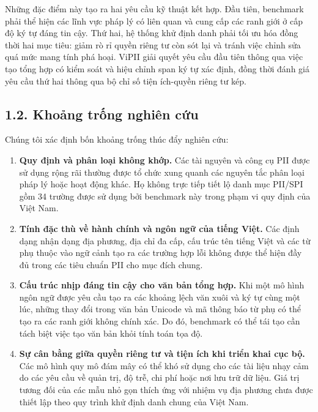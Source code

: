 \documentclass[
  11pt,
  a4paper,
]{article}
\providecommand{\tightlist}{%
  \setlength{\itemsep}{0pt}\setlength{\parskip}{0pt}}
\begin{document}
Những đặc điểm này tạo ra hai yêu cầu kỹ thuật kết hợp. Đầu tiên,
benchmark phải thể hiện các lĩnh vực pháp lý có liên quan và cung cấp
các ranh giới ở cấp độ ký tự đáng tin cậy. Thứ hai, hệ thống khử định
danh phải tối ưu hóa đồng thời hai mục tiêu: giảm rò rỉ quyền riêng tư
còn sót lại và tránh việc chỉnh sửa quá mức mang tính phá hoại. ViPII
giải quyết yêu cầu đầu tiên thông qua việc tạo tổng hợp có kiểm soát và
hiệu chỉnh span ký tự xác định, đồng thời đánh giá yêu cầu thứ hai thông
qua bộ chỉ số tiện ích-quyền riêng tư kép.

\subsection{1.2. Khoảng trống nghiên
cứu}\label{khoux1ea3ng-trux1ed1ng-nghiuxean-cux1ee9u}

Chúng tôi xác định bốn khoảng trống thúc đẩy nghiên cứu:

\begin{enumerate}
\def\labelenumi{\arabic{enumi}.}
\tightlist
\item
  \textbf{Quy định và phân loại không khớp.} Các tài nguyên và công cụ
  PII được sử dụng rộng rãi thường được tổ chức xung quanh các nguyên
  tắc phân loại pháp lý hoặc hoạt động khác. Họ không trực tiếp tiết lộ
  danh mục PII/SPI gồm 34 trường được sử dụng bởi benchmark này trong
  phạm vi quy định của Việt Nam.
\item
  \textbf{Tính đặc thù về hành chính và ngôn ngữ của tiếng Việt.} Các
  định dạng nhận dạng địa phương, địa chỉ đa cấp, cấu trúc tên tiếng
  Việt và các từ phụ thuộc vào ngữ cảnh tạo ra các trường hợp lỗi không
  được thể hiện đầy đủ trong các tiêu chuẩn PII cho mục đích chung.
\item
  \textbf{Cấu trúc nhịp đáng tin cậy cho văn bản tổng hợp.} Khi một mô
  hình ngôn ngữ được yêu cầu tạo ra các khoảng lệch văn xuôi và ký tự
  cùng một lúc, những thay đổi trong văn bản Unicode và mã thông báo từ
  phụ có thể tạo ra các ranh giới không chính xác. Do đó, benchmark có
  thể tái tạo cần tách biệt việc tạo văn bản khỏi tính toán tọa độ.
\item
  \textbf{Sự cân bằng giữa quyền riêng tư và tiện ích khi triển khai cục
  bộ.} Các mô hình quy mô đám mây có thể khó sử dụng cho các tài liệu
  nhạy cảm do các yêu cầu về quản trị, độ trễ, chi phí hoặc nơi lưu trữ
  dữ liệu. Giá trị tương đối của các mẫu nhỏ gọn thích ứng với nhiệm vụ
  địa phương chưa được thiết lập theo quy trình khử định danh chung của
  Việt Nam.
\end{enumerate}
\end{document}
